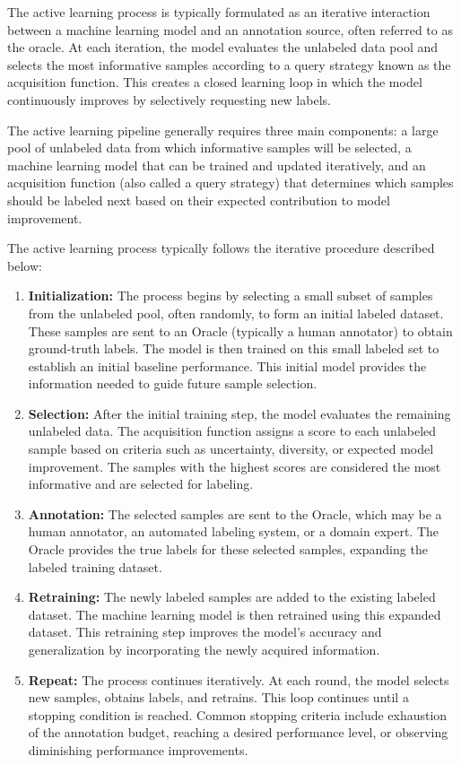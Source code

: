 \documentclass{article}
\begin{document}
The active learning process is typically formulated as an iterative interaction between a machine learning model and an annotation source, often referred to as the oracle. At each iteration, the model evaluates the unlabeled data pool and selects the most informative samples according to a query strategy known as the acquisition function. This creates a closed learning loop in which the model continuously improves by selectively requesting new labels.

The active learning pipeline generally requires three main components: a large pool of unlabeled data from which informative samples will be selected, a machine learning model that can be trained and updated iteratively, and an acquisition function (also called a query strategy) that determines which samples should be labeled next based on their expected contribution to model improvement.

The active learning process typically follows the iterative procedure described below:

\begin{enumerate}

\item \textbf{Initialization:} 
The process begins by selecting a small subset of samples from the unlabeled pool, often randomly, to form an initial labeled dataset. These samples are sent to an Oracle (typically a human annotator) to obtain ground-truth labels. The model is then trained on this small labeled set to establish an initial baseline performance. This initial model provides the information needed to guide future sample selection.

\item \textbf{Selection:}
After the initial training step, the model evaluates the remaining unlabeled data. The acquisition function assigns a score to each unlabeled sample based on criteria such as uncertainty, diversity, or expected model improvement. The samples with the highest scores are considered the most informative and are selected for labeling.

\item \textbf{Annotation:} 
The selected samples are sent to the Oracle, which may be a human annotator, an automated labeling system, or a domain expert. The Oracle provides the true labels for these selected samples, expanding the labeled training dataset.

\item \textbf{Retraining:}
The newly labeled samples are added to the existing labeled dataset. The machine learning model is then retrained using this expanded dataset. This retraining step improves the model’s accuracy and generalization by incorporating the newly acquired information.

\item \textbf{Repeat:}
The process continues iteratively. At each round, the model selects new samples, obtains labels, and retrains. This loop continues until a stopping condition is reached. Common stopping criteria include exhaustion of the annotation budget, reaching a desired performance level, or observing diminishing performance improvements.

\end{enumerate}
\end{document}
